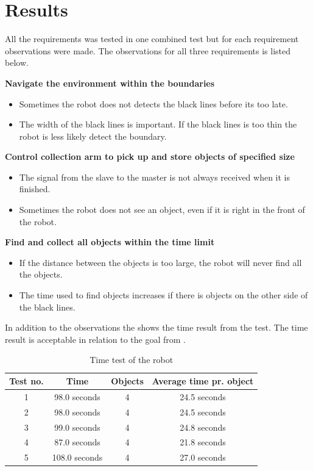 \section{Results}

All the requirements was tested in one combined test but for each requirement observations were made. The observations for all three requirements is listed below.

\textbf{Navigate the environment within the boundaries}
\begin{itemize}
\item Sometimes the robot does not detects the black lines before its too late.
\item The width of the black lines is important. If the black lines is too thin the robot is less likely detect the boundary.
\end{itemize}

\textbf{Control collection arm to pick up and store objects of specified size}
\begin{itemize}
\item The signal from the slave to the master is not always received when it is finished.
\item Sometimes the robot does not see an object, even if it is right in the front of the robot.
\end{itemize}

\textbf{Find and collect all objects within the time limit}
\begin{itemize}
\item If the distance between the objects is too large, the robot will never find all the objects. 
\item The time used to find objects increases if there is objects on the other side of the black lines.  
\end{itemize}

In addition to the observations the  shows the time result from the test. The time result is acceptable in relation to the goal from .

\begin{table}[H]
	\centering
   \begin{tabular}{|c|c|c|c|}
   \hline  
   Test no. & Time & Objects & Average time pr. object \\ \hline
      1    & 98.0 seconds    & 4 & 24.5 seconds   \\ \hline
      2    & 98.0 seconds    & 4 & 24.5 seconds  \\ \hline
      3    & 99.0 seconds    & 4 & 24.8 seconds  \\ \hline
      4    & 87.0 seconds    & 4 & 21.8 seconds  \\ \hline
      5    & 108.0 seconds   & 4 & 27.0 seconds  \\ \hline
   \end{tabular}
   \caption{\label{table:FinalTimeTestRobot} Time test of the robot}
\end{table}







